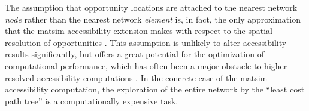 %
%

%

The assumption that opportunity locations are attached to the nearest network \emph{node} rather than the nearest 
network \emph{element} is, in fact, the only approximation that the \gls{matsim}
accessibility extension makes with respect to the spatial resolution of opportunities 
\citep{NicolaiNagel2012HiResAccessibilityMethodInBook}. This assumption is unlikely to alter accessibility 
results significantly, but offers a great potential for the
optimization of computational performance, which has often been a major obstacle to higher-resolved 
accessibility computations \citep{Kwan1998PointBasedAccessibility, BuettnerEtAl2010Erreichbarkeitsatlas}. 
In the concrete case of the \gls{matsim} accessibility computation, the exploration of the entire network 
by the ``least cost path tree'' is a computationally expensive task.

